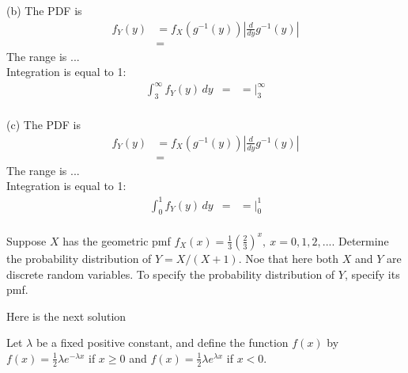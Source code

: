\documentclass[12pt,letterpaper]{exam}
\begin{document}
\begin{questions}
\begin{solution}
		
		(b)
		The PDF is
		\begin{align*}
			f_Y(y) &= f_X(g^{-1}(y)) \left|\frac{d}{dy}g^{-1}(y) \right| \\
			&=
		\end{align*}
		The range is ... \\
		Integration is equal to 1:
		\begin{align*}
			\int_{3}^{\infty}f_Y(y) \,dy
			&=
			&= \left.  \right|_3^\infty \\
		\end{align*}
		
		(c)
		The PDF is
		\begin{align*}
			f_Y(y) &= f_X(g^{-1}(y)) \left|\frac{d}{dy}g^{-1}(y) \right| \\
			&=
		\end{align*}
		The range is ... \\
		Integration is equal to 1:
		\begin{align*}
			\int_{0}^{1}f_Y(y) \,dy
			&=
			&= \left.  \right|_0^1 \\
		\end{align*}
		
	\end{solution}
	
	\setcounter{question}{2}
	\question Suppose $X$ has the geometric pmf $f_X(x) = \frac{1}{3} \left(\frac{2}{3}\right)^{x}, \ x = 0,1,2,...$. Determine the probability distribution of $Y= X/(X+1)$. Noe that here both $X$ and $Y$ are discrete random variables. To specify the probability distribution of $Y$, specify its pmf.
	
	\begin{solution}
		Here is the next solution
	\end{solution}

	\question Let $\lambda$ be a fixed positive constant, and define the function $f(x)$ by $f(x) = \frac{1}{2} \lambda e^{-\lambda x}$ if $x \ge 0$ and $f(x) = \frac{1}{2} \lambda e^{\lambda x}$ if $x < 0$. 
	
\end{questions}
\end{document}
